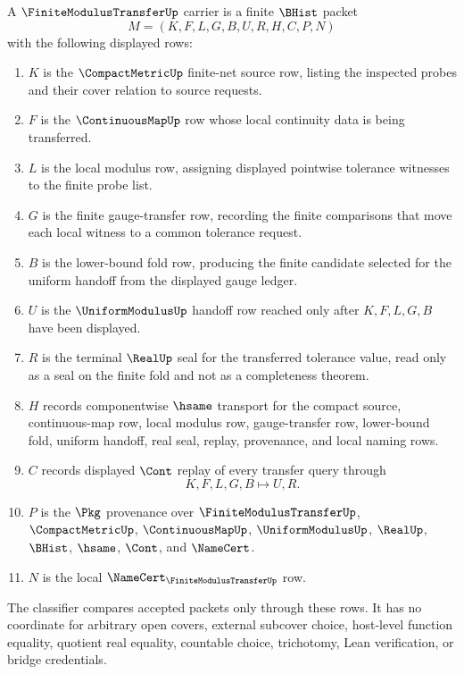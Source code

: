 \begin{definition}
\label{def:finite-modulus-transfer-carrier}
A $\FiniteModulusTransferUp$ carrier is a finite $\BHist$ packet
$$
M=(K,F,L,G,B,U,R,H,C,P,N)
$$
with the following displayed rows:
\begin{enumerate}
\item $K$ is the $\CompactMetricUp$ finite-net source row, listing the inspected probes and their cover relation to source requests.
\item $F$ is the $\ContinuousMapUp$ row whose local continuity data is being transferred.
\item $L$ is the local modulus row, assigning displayed pointwise tolerance witnesses to the finite probe list.
\item $G$ is the finite gauge-transfer row, recording the finite comparisons that move each local witness to a common tolerance request.
\item $B$ is the lower-bound fold row, producing the finite candidate selected for the uniform handoff from the displayed gauge ledger.
\item $U$ is the $\UniformModulusUp$ handoff row reached only after $K,F,L,G,B$ have been displayed.
\item $R$ is the terminal $\RealUp$ seal for the transferred tolerance value, read only as a seal on the finite fold and not as a completeness theorem.
\item $H$ records componentwise $\hsame$ transport for the compact source, continuous-map row, local modulus row, gauge-transfer row, lower-bound fold, uniform handoff, real seal, replay, provenance, and local naming rows.
\item $C$ records displayed $\Cont$ replay of every transfer query through
$$
K,F,L,G,B \longmapsto U,R .
$$
\item $P$ is the $\Pkg$ provenance over $\FiniteModulusTransferUp$, $\CompactMetricUp$, $\ContinuousMapUp$, $\UniformModulusUp$, $\RealUp$, $\BHist$, $\hsame$, $\Cont$, and $\NameCert$.
\item $N$ is the local $\NameCert_{\FiniteModulusTransferUp}$ row.
\end{enumerate}
The classifier compares accepted packets only through these rows. It has no coordinate for arbitrary open covers, external subcover choice, host-level function equality, quotient real equality, countable choice, trichotomy, Lean verification, or bridge credentials.
\end{definition}

